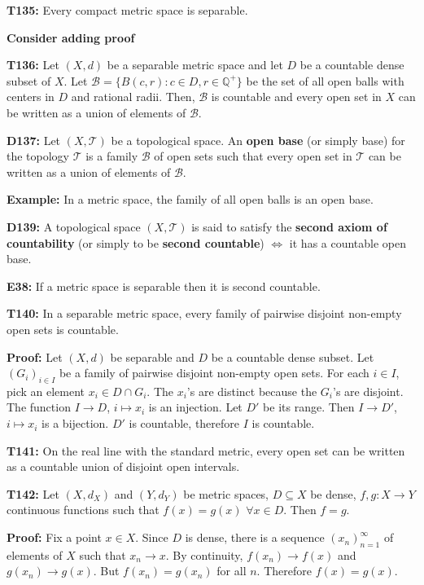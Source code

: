 \documentclass[twocolumn,10pt]{article}
\begin{document}
\textbf{T135:} Every compact metric space is separable.

\color{red}
\textbf{Consider adding proof}
\color{black}

\textbf{T136:} Let $(X,d)$ be a separable metric space and let $D$ be a countable dense subset of $X$. Let $\mathcal{B}=\{B(c,r):c\in D,r\in\mathbb{Q}^+\}$ be the set of all open balls with centers in $D$ and rational radii. Then, $\mathcal{B}$ is countable and every open set in $X$ can be written as a union of elements of $\mathcal{B}$.

\textbf{D137:} Let $(X,\mathcal{T})$ be a topological space. An \textbf{open base} (or simply base) for the topology $\mathcal{T}$ is a family $\mathcal{B}$ of open sets such that every open set in $\mathcal{T}$ can be written as a union of elements of $\mathcal{B}$.

\color{red}
\textbf{Example:} In a metric space, the family of all open balls is an open base.
\color{black}

\textbf{D139:} A topological space $(X,\mathcal{T})$ is said to satisfy the \textbf{second axiom of countability} (or simply to be \textbf{second countable}) $\Leftrightarrow$ it has a countable open base.

\color{red}
\textbf{E38:} If a metric space is separable then it is second countable.
\color{black}

\textbf{T140:} In a separable metric space, every family of pairwise disjoint non-empty open sets is countable.

\color{red}
\textbf{Proof:} Let $(X,d)$ be separable and $D$ be a countable dense subset. Let $(G_i)_{i\in I}$ be a family of pairwise disjoint non-empty open sets. For each $i\in I$, pick an element $x_i\in D\cap G_i$. The $x_i$'s are distinct because the $G_i$'s are disjoint. The function $I\to D$, $i\mapsto x_i$ is an injection. Let $D'$ be its range. Then $I\to D'$, $i\mapsto x_i$ is a bijection. $D'$ is countable, therefore $I$ is countable.
\color{black}

\textbf{T141:} On the real line with the standard metric, every open set can be written as a countable union of disjoint open intervals.

\textbf{T142:} Let $(X,d_X)$ and $(Y,d_Y)$ be metric spaces, $D\subseteq X$ be dense, $f,g:X\to Y$ continuous functions such that $f(x)=g(x)$ $\forall x\in D$. Then $f=g$.

\color{red}
\textbf{Proof:} Fix a point $x\in X$. Since $D$ is dense, there is a sequence $(x_n)_{n=1}^{\infty}$ of elements of $X$ such that $x_n\to x$. By continuity, $f(x_n)\to f(x)$ and $g(x_n)\to g(x)$. But $f(x_n)=g(x_n)$ for all $n$. Therefore $f(x)=g(x)$.
\color{black}
\end{document}
